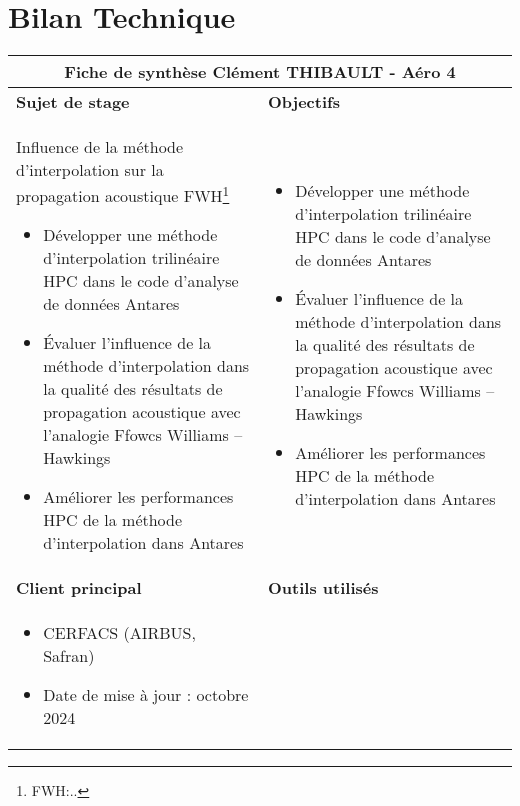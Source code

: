 \section*{Bilan Technique}
\begin{table}[ht]
\centering
\begin{tabular}{|p{8cm}|p{8cm}|}
\hline
\multicolumn{2}{|c|}{\textbf{Fiche de synthèse}   \hspace{7cm}   Clément THIBAULT - Aéro 4} \\ 
\hline
\textbf{Sujet de stage} & \textbf{Objectifs} \\ 
\hline
\begin{minipage}[t]{8cm}
Influence de la méthode d’interpolation sur la propagation acoustique FWH\footnote{FWH:.. }
\begin{itemize}
    \item Développer une méthode d’interpolation trilinéaire HPC dans le code d’analyse de données Antares
    \item Évaluer l’influence de la méthode d’interpolation dans la qualité des résultats de propagation acoustique avec l’analogie Ffowcs Williams – Hawkings
    \item Améliorer les performances HPC de la méthode d’interpolation dans Antares
\end{itemize}
\end{minipage} & 
\begin{minipage}[t]{8cm}
\begin{itemize}
    \item Développer une méthode d’interpolation trilinéaire HPC dans le code d’analyse de données Antares
    \item Évaluer l’influence de la méthode d’interpolation dans la qualité des résultats de propagation acoustique avec l’analogie Ffowcs Williams – Hawkings
    \item Améliorer les performances HPC de la méthode d’interpolation dans Antares
\end{itemize}
\end{minipage} \\ 
\hline
\textbf{Client principal} & \textbf{Outils utilisés} \\ 
\hline
\begin{minipage}[t]{8cm}
\begin{itemize}
    \item CERFACS (AIRBUS, Safran)
    \item Date de mise à jour : octobre 2024

\end{itemize}
\end{minipage}
\end{tabular}
\end{table}
